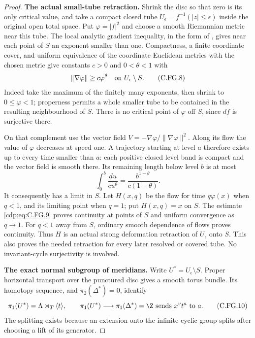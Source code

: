 \begin{proof}
\par\medskip\noindent\textbf{The actual small-tube retraction.}
Shrink the disc so that zero is its only critical value, and take
a compact closed tube $U_\epsilon=f^{-1}(|z|\le\epsilon)$ inside
the original open total space. Put $\varphi=|f|^2$ and choose a
smooth Riemannian metric near this tube. The local analytic gradient
inequality, in the form of
\cite[Theorem (LI), p.~775]{Kurdyka1998}, gives near each point of
$S$ an exponent smaller than one. Compactness, a finite coordinate
cover, and uniform equivalence of the coordinate Euclidean metrics
with the chosen metric give constants $c>0$ and $0<\theta<1$ with
\[
                 \|\nabla\varphi\|\ge c\varphi^\theta
                   \quad\hbox{on }U_\epsilon\setminus S.
                                                        \tag{C.FG.8}\label{cdp:eq:C.FG.8}
\]
Indeed take the maximum of the finitely many exponents, then shrink
to $0\le\varphi<1$; properness permits a whole smaller tube to be
contained in the resulting neighbourhood of $S$. There is no
critical point of $\varphi$ off $S$, since $df$ is surjective there.

On that complement use the vector field
$V=-\nabla\varphi/\|\nabla\varphi\|^2$. Along its flow the value
of $\varphi$ decreases at speed one. A trajectory starting at level
$a$ therefore exists up to every time smaller than $a$: each
positive closed level band is compact and the vector field is
smooth there. Its remaining length below level $b$ is at most
\[
          \int_0^b\frac{du}{c u^\theta}
                 =\frac{b^{1-\theta}}{c(1-\theta)}.    \tag{C.FG.9}\label{cdp:eq:C.FG.9}
\]
It consequently has a limit in $S$. Let $H(x,q)$ be the flow for
time $q\varphi(x)$ when $q<1$, and its limiting point when $q=1$;
put $H(x,q)=x$ on $S$. The estimate \eqref{cdp:eq:C.FG.9} proves continuity
at points of $S$ and uniform convergence as $q\to1$. For $q<1$
away from $S$, ordinary smooth dependence of flows proves
continuity. Thus $H$ is an actual strong deformation retraction
of $U_\epsilon$ onto $S$. This also proves the needed retraction
for every later resolved or covered tube. No invariant-cycle
surjectivity is involved.

\par\medskip\noindent\textbf{The exact normal subgroup of meridians.}
Write $U^*=U_\epsilon\setminus S$. Proper horizontal transport
over the punctured disc gives a smooth torus bundle. Its homotopy
sequence, and $\pi_2(\Delta^*)=0$, identify
\[
       \pi_1(U^*)=\Lambda\rtimes_T\langle t\rangle,
       \qquad \pi_1(U^*)\longrightarrow\pi_1(\Delta^*)=\Z
       \text{ sends }x^v t^a\text{ to }a .             \tag{C.FG.10}\label{cdp:eq:C.FG.10}
\]
The splitting exists because an extension onto the infinite cyclic
group splits after choosing a lift of its generator.


\end{proof}
